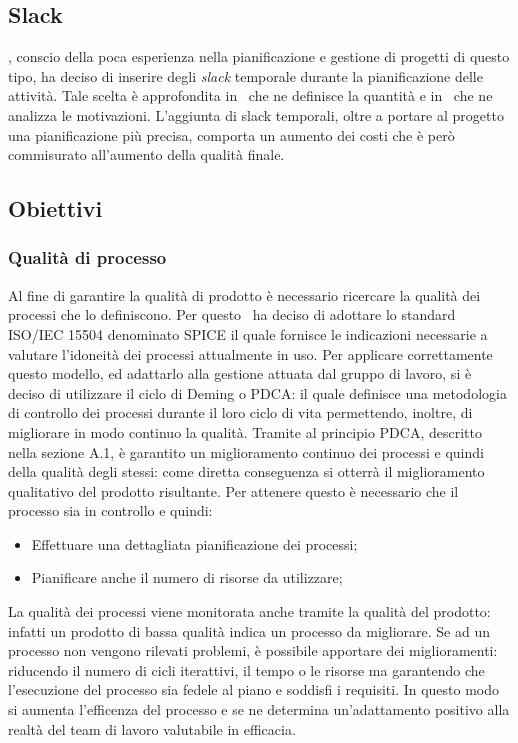 \subsection{Slack}
\gruppo, conscio della poca esperienza nella pianificazione e gestione di progetti di questo tipo, ha deciso di inserire degli \textit{slack} temporale durante la pianificazione delle attività. Tale scelta è approfondita in \infoNDP ~che ne definisce la quantità e in \infoPDP ~che ne analizza le motivazioni.
L'aggiunta di slack temporali, oltre a portare al progetto una pianificazione più precisa, comporta un aumento dei costi che è però commisurato all'aumento della qualità finale.
\subsection{Obiettivi}
\subsubsection{Qualità di processo}
Al fine di garantire la qualità di prodotto è necessario ricercare la qualità dei processi che lo definiscono. Per questo \gruppo ~ha deciso di adottare lo standard ISO/IEC 15504 denominato SPICE il quale fornisce le indicazioni necessarie a valutare l'idoneità dei processi attualmente in uso.
Per applicare correttamente questo modello, ed adattarlo alla gestione attuata dal gruppo di lavoro, si è deciso di utilizzare il ciclo di Deming o PDCA: il quale definisce una metodologia di controllo dei processi durante il loro ciclo di vita permettendo, inoltre, di migliorare in modo continuo la qualità.
Tramite al principio PDCA, descritto nella sezione A.1, è garantito un miglioramento continuo dei processi e quindi della qualità degli stessi: come diretta conseguenza si otterrà il miglioramento qualitativo del prodotto risultante.
Per attenere questo è necessario che il processo sia in controllo e quindi:
\begin{itemize}
\item Effettuare una dettagliata pianificazione dei processi;
\item Pianificare anche il numero di risorse da utilizzare;
\end{itemize}
La qualità dei processi viene monitorata anche tramite la qualità del prodotto: infatti un prodotto di bassa qualità indica un processo da migliorare. Se ad un processo non vengono rilevati problemi, è possibile apportare dei miglioramenti: riducendo il numero di cicli iterattivi, il tempo o le risorse ma garantendo che l'esecuzione del processo sia fedele al piano e soddisfi i requisiti. In questo modo si aumenta l'efficenza del processo e se ne determina un'adattamento positivo alla realtà del team di lavoro valutabile in efficacia.
